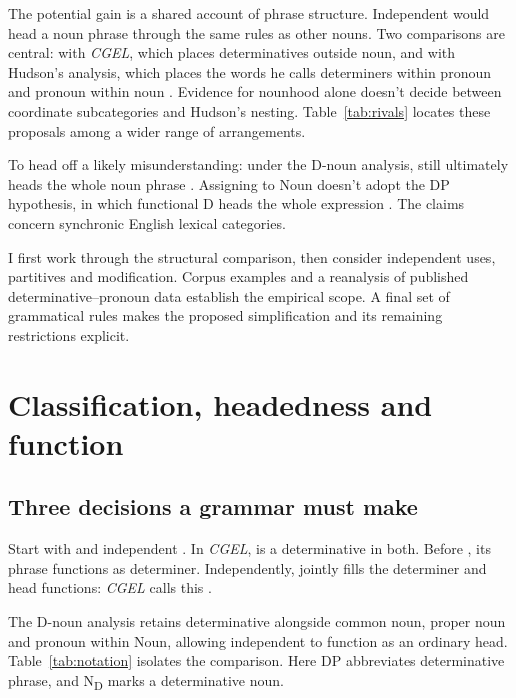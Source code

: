\documentclass[12pt]{article}
\begin{document}
The potential gain is a shared account of phrase structure. Independent  would head a noun phrase through the same rules as other nouns. Two comparisons are central: with \textit{CGEL}, which places determinatives outside noun, and with Hudson's analysis, which places the words he calls determiners within pronoun and pronoun within noun \citep{hudson2004determiners,hudson2010wordgrammar}. Evidence for nounhood alone doesn't decide between coordinate subcategories and Hudson's nesting. Table~\ref{tab:rivals} locates these proposals among a wider range of arrangements.

To head off a likely misunderstanding: under the D-noun analysis,  still ultimately heads the whole noun phrase . Assigning  to Noun doesn't adopt the DP hypothesis, in which functional D heads the whole expression \citep{abney1987}. The claims concern synchronic English lexical categories.

I first work through the structural comparison, then consider independent uses, partitives and modification. Corpus examples and a reanalysis of published determinative--pronoun data establish the empirical scope. A final set of grammatical rules makes the proposed simplification and its remaining restrictions explicit.

\section{Classification, headedness and function}\label{sec:alternatives}

\subsection{Three decisions a grammar must make}

Start with  and independent . In \textit{CGEL},  is a determinative in both. Before , its phrase functions as determiner. Independently,  jointly fills the determiner and head functions: \textit{CGEL} calls this  \citep[410--412]{huddleston2002}.

The D-noun analysis retains determinative alongside common noun, proper noun and pronoun within Noun, allowing independent  to function as an ordinary head. Table~\ref{tab:notation} isolates the comparison. Here DP abbreviates determinative phrase, and N\textsubscript{D} marks a determinative noun.
\end{document}
